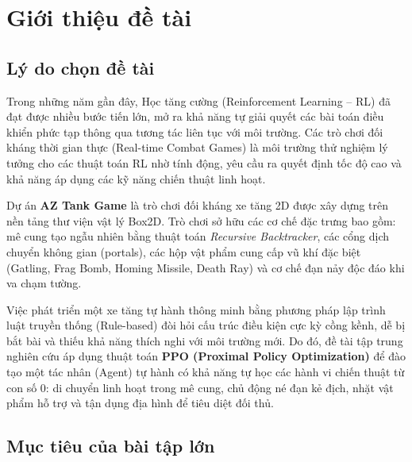 \documentclass[a4paper, 12pt]{report}
\begin{document}
  \tableofcontents
  \newpage

  \chapter{Giới thiệu đề tài}

  \section{Lý do chọn đề tài}

  Trong những năm gần đây, Học tăng cường (Reinforcement Learning -- RL) đã đạt được nhiều bước tiến lớn, mở ra khả năng tự giải quyết các bài toán điều khiển phức tạp thông qua tương tác liên tục với môi trường. Các trò chơi đối kháng thời gian thực (Real-time Combat Games) là môi trường thử nghiệm lý tưởng cho các thuật toán RL nhờ tính động, yêu cầu ra quyết định tốc độ cao và khả năng áp dụng các kỹ năng chiến thuật linh hoạt.

  Dự án \textbf{AZ Tank Game} là trò chơi đối kháng xe tăng 2D được xây dựng trên nền tảng thư viện vật lý Box2D. Trò chơi sở hữu các cơ chế đặc trưng bao gồm: mê cung tạo ngẫu nhiên bằng thuật toán \textit{Recursive Backtracker}, các cổng dịch chuyển không gian (portals), các hộp vật phẩm cung cấp vũ khí đặc biệt (Gatling, Frag Bomb, Homing Missile, Death Ray) và cơ chế đạn nảy độc đáo khi va chạm tường.

  Việc phát triển một xe tăng tự hành thông minh bằng phương pháp lập trình luật truyền thống (Rule-based) đòi hỏi cấu trúc điều kiện cực kỳ cồng kềnh, dễ bị bắt bài và thiếu khả năng thích nghi với môi trường mới. Do đó, đề tài tập trung nghiên cứu áp dụng thuật toán \textbf{PPO (Proximal Policy Optimization)} để đào tạo một tác nhân (Agent) tự hành có khả năng tự học các hành vi chiến thuật từ con số 0: di chuyển linh hoạt trong mê cung, chủ động né đạn kẻ địch, nhặt vật phẩm hỗ trợ và tận dụng địa hình để tiêu diệt đối thủ.

  \section{Mục tiêu của bài tập lớn}
\end{document}
